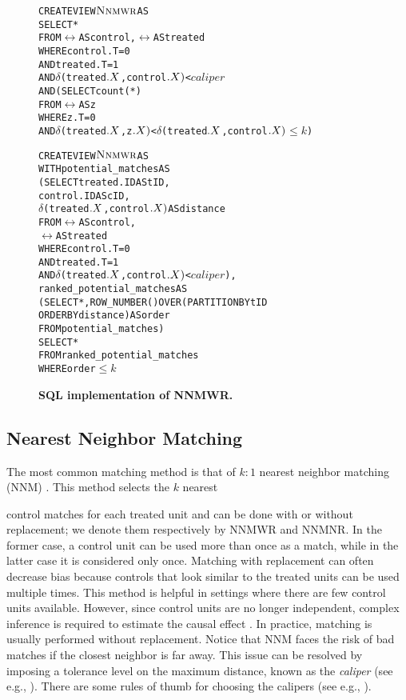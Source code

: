 \begin{figure}
  \centering
\begin{alltt} 
CREATE VIEW \(\nnmwr\) AS
SELECT *
   FROM \(\rel\) AS control,\(\rel\) AS treated
WHERE control.T=0  
  AND treated.T=1
  AND \(\delta\)(treated\(.\cv\), control\(.\cv)\) < \(caliper\)
  AND (SELECT count(*)
     FROM \(\rel\) AS z
     WHERE z.T=0
       AND \(\delta\)(treated\(.\cv\),z\(.\cv)\) < \(\delta\)(treated\(.\cv\),control\(.\cv)\) \(\leq k\))
\end{alltt} \vspace{-.5cm}
\vspace{-.4cm}
\begin{alltt} 
CREATE VIEW \(\nnmwr\) AS
WITH potential_matches AS
  (SELECT treated.ID AS tID,
          control.ID AS cID,
         \(\delta\)(treated\(.\cv\),control\(.\cv)\)  AS distance
   FROM \(\rel\) AS control,
        \(\rel\) AS treated
   WHERE control.T=0 
     AND treated.T=1
     AND \(\delta\)(treated\(.\cv\),control\(.\cv)\) < \(caliper\)),
      ranked_potential_matches AS
  (SELECT *, ROW_NUMBER() OVER (PARTITION BY tID
                       ORDER BY distance) AS order
   FROM potential_matches)
SELECT *
FROM ranked_potential_matches
WHERE order \(\leq k\)
\end{alltt}
\vspace{-.5cm}
  \caption{\bf SQL implementation of NNMWR.}\label{fig:nnmwr}
\end{figure}


\subsection{Nearest Neighbor Matching}
\label{sec:nnm}
The most common matching method is that of $k:1$ nearest neighbor
matching (NNM) \cite{Rubin1983b,ho2005,Stuart10}. This method selects
the $k$ nearest  control matches for each treated
unit and can be done with or without replacement; we denote
them respectively by NNMWR and NNMNR.  In the former case, a control
unit can be used more than once as a match, while in the latter case
it is considered only once. Matching with replacement can often
decrease bias because controls that look similar to the treated units
can be used multiple times.  This method is helpful in settings where
there are few control units available. However, since control units
are no longer independent, complex inference is required to estimate
the causal effect \cite{dehejia99}. In practice, matching is usually
performed without replacement.  Notice that NNM faces the risk of bad
matches if the closest neighbor is far away. This issue can be
resolved by imposing a tolerance level on the maximum distance, known
as the {\em caliper} (see e.g., \cite{lunt2014selecting}). There are some rules of thumb for choosing the
calipers (see e.g., \cite{lunt2014selecting}).


